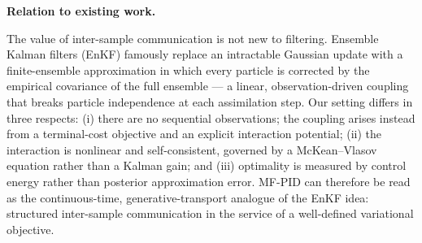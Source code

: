 \documentclass[11pt,onecolumn]{article}
\begin{document}
\textbf{Relation to existing work.} 

The value of inter-sample communication is not new to filtering. Ensemble Kalman filters (EnKF) \cite{evensen_data_2009} famously replace an intractable Gaussian update with a finite-ensemble approximation in which every particle is corrected by the empirical covariance of the full ensemble — a linear, observation-driven coupling that breaks particle independence at each assimilation step. Our setting differs in three respects: (i) there are no sequential observations; the coupling arises instead from a terminal-cost objective and an explicit interaction potential; (ii) the interaction is nonlinear and self-consistent, governed by a McKean–Vlasov equation rather than a Kalman gain; and (iii) optimality is measured by control energy rather than posterior approximation error. MF-PID can therefore be read as the continuous-time, generative-transport analogue of the EnKF idea: structured inter-sample communication in the service of a well-defined variational objective.
\end{document}
